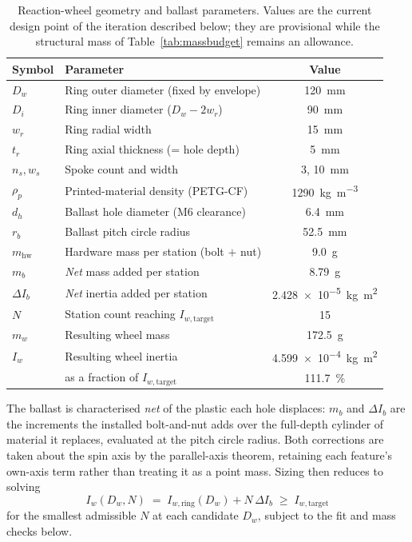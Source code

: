 \begin{table}[htbp]
\centering
\caption[Reaction-wheel geometry and ballast parameters]{Reaction-wheel
geometry and ballast parameters. Values are the current design point of the
iteration described below; they are provisional while the structural mass of
Table~\ref{tab:massbudget} remains an allowance.}
\label{tab:rw_params}
\small
\begin{tabular}{l L{6.4cm} c}
\toprule
Symbol & Parameter & Value \\
\midrule
$D_w$      & Ring outer diameter (fixed by envelope)   & \qty{120}{\milli\metre} \\
$D_i$      & Ring inner diameter ($D_w - 2w_r$)        & \qty{90}{\milli\metre} \\
$w_r$      & Ring radial width                         & \qty{15}{\milli\metre} \\
$t_r$      & Ring axial thickness (= hole depth)       & \qty{5}{\milli\metre} \\
$n_s, w_s$ & Spoke count and width                     & $3$, \qty{10}{\milli\metre} \\
$\rho_p$   & Printed-material density (PETG-CF)         & \qty{1290}{\kilo\gram\per\metre\cubed} \\
$d_h$      & Ballast hole diameter (M6 clearance)      & \qty{6.4}{\milli\metre} \\
$r_b$      & Ballast pitch circle radius               & \qty{52.5}{\milli\metre} \\
$m_{\text{hw}}$ & Hardware mass per station (bolt $+$ nut) & \qty{9.0}{\gram} \\
$m_b$      & \emph{Net} mass added per station          & \qty{8.79}{\gram} \\
$\Delta I_b$ & \emph{Net} inertia added per station     & \qty{2.428e-5}{\kilogram\metre\squared} \\
$N$        & Station count reaching $I_{w,\text{target}}$ & \num{15} \\
$m_w$      & Resulting wheel mass                      & \qty{172.5}{\gram} \\
$I_w$      & Resulting wheel inertia                   & \qty{4.599e-4}{\kilogram\metre\squared} \\
           & \quad as a fraction of $I_{w,\text{target}}$ & \qty{111.7}{\percent} \\
\bottomrule
\end{tabular}
\end{table}

The ballast is characterised \emph{net} of the plastic each hole displaces:
$m_b$ and $\Delta I_b$ are the increments the installed bolt-and-nut adds over
the full-depth cylinder of material it replaces, evaluated at the pitch circle
radius. Both corrections are taken about the spin axis by the parallel-axis
theorem, retaining each feature's own-axis term rather than treating it as a
point mass. Sizing then reduces to solving
\[
I_{w}(D_w, N) \;=\; I_{w,\text{ring}}(D_w) + N\,\Delta I_b \;\geq\; I_{w,\text{target}}
\]
for the smallest admissible $N$ at each candidate $D_w$, subject to the fit and
mass checks below.

